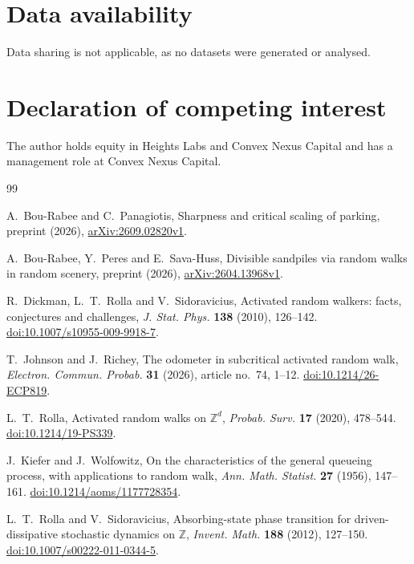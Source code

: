 \documentclass[11pt]{article}
\theoremstyle{remark}
\newcommand{\Z}{\mathbb Z}
\newcommand{\1}{\mathbf 1}
\begin{document}
\section*{Data availability}

Data sharing is not applicable, as no datasets were generated or analysed.

\section*{Declaration of competing interest}

The author holds equity in Heights Labs and Convex Nexus Capital and has a management role at Convex Nexus Capital.

\begin{thebibliography}{99}

A.~Bou-Rabee and C.~Panagiotis,
Sharpness and critical scaling of parking,
preprint (2026), \href{https://arxiv.org/abs/2609.02820}{arXiv:2609.02820v1}.

A.~Bou-Rabee, Y.~Peres and E.~Sava-Huss,
Divisible sandpiles via random walks in random scenery,
preprint (2026), \href{https://arxiv.org/abs/2604.13968}{arXiv:2604.13968v1}.

R.~Dickman, L.~T.~Rolla and V.~Sidoravicius,
Activated random walkers: facts, conjectures and challenges,
\emph{J. Stat. Phys.} \textbf{138} (2010), 126--142.
\href{https://doi.org/10.1007/s10955-009-9918-7}{doi:10.1007/s10955-009-9918-7}.

T.~Johnson and J.~Richey,
The odometer in subcritical activated random walk,
\emph{Electron. Commun. Probab.} \textbf{31} (2026), article no.~74, 1--12.
\href{https://doi.org/10.1214/26-ECP819}{doi:10.1214/26-ECP819}.

L.~T.~Rolla,
Activated random walks on $\Z^d$,
\emph{Probab. Surv.} \textbf{17} (2020), 478--544.
\href{https://doi.org/10.1214/19-PS339}{doi:10.1214/19-PS339}.

J.~Kiefer and J.~Wolfowitz,
On the characteristics of the general queueing process, with applications to random walk,
\emph{Ann. Math. Statist.} \textbf{27} (1956), 147--161.
\href{https://doi.org/10.1214/aoms/1177728354}{doi:10.1214/aoms/1177728354}.

L.~T.~Rolla and V.~Sidoravicius,
Absorbing-state phase transition for driven-dissipative stochastic dynamics on $\Z$,
\emph{Invent. Math.} \textbf{188} (2012), 127--150.
\href{https://doi.org/10.1007/s00222-011-0344-5}{doi:10.1007/s00222-011-0344-5}.


\end{thebibliography}
\end{document}
